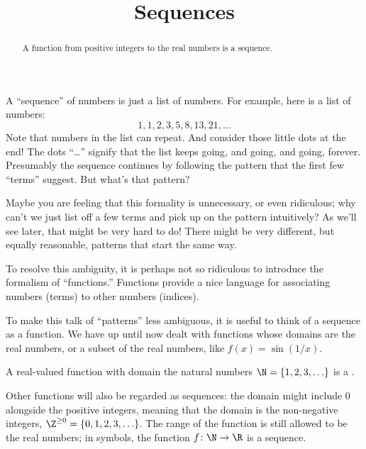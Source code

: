 \documentclass{ximera}
\title[Dig-In:]{Sequences}
\begin{document}
\begin{abstract}
  A function from positive integers to the real numbers is a sequence.
\end{abstract}
\maketitle

A ``sequence'' of numbers is just a list of numbers.  For example,
here is a list of numbers:
\[
1,1, 2, 3, 5, 8, 13, 21, \ldots
\]
Note that numbers in the list can repeat.  And consider those little
dots at the end!  The dots ``\ldots'' signify that the list keeps
going, and going, and going, forever.  Presumably the sequence
continues by following the pattern that the first few ``terms''
suggest.  But what's that pattern?

\begin{warning}
  Maybe you are feeling that this formality is unnecessary, or even
  ridiculous; why can't we just list off a few terms and pick up on
  the pattern intuitively?  As we'll see later, that might be very
  hard to do!  There might be very different, but equally reasonable,
  patterns that start the same way.

  To resolve this ambiguity, it is perhaps not so ridiculous to
  introduce the formalism of ``functions.''  Functions provide a nice
  language for associating numbers (terms) to other numbers
  (indices).
\end{warning}


To make this talk of ``patterns'' less ambiguous, it is useful to
think of a sequence as a function. We have up until now dealt with
functions whose domains are the real numbers, or a subset of the real
numbers, like $f(x)=\sin (1/x)$.

A real-valued function with domain the natural numbers
$\N=\{1,2,3,\ldots\}$ is a .

Other functions will also be regarded as sequences: the domain might
include $0$ alongside the positive integers, meaning that the
domain is the non-negative integers, $\Z^{\ge0}=\{0,1,2,3,\ldots\}$.  The range of the function is still
allowed to be the real numbers; in symbols, the function $f\colon
\N\to\R$ is a sequence.
\end{document}
